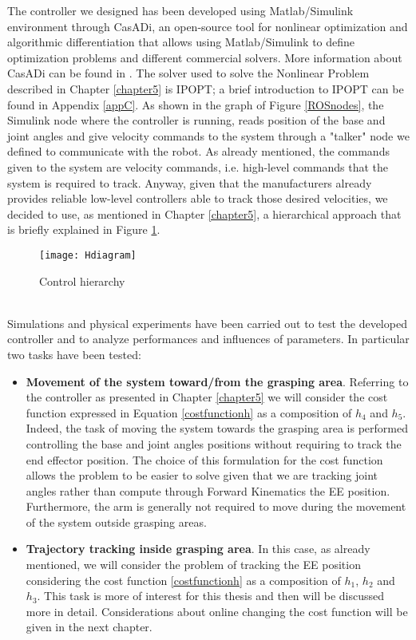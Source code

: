 The controller we designed has been developed using Matlab/Simulink environment through CasADi, an open-source tool for nonlinear optimization and algorithmic differentiation that allows using Matlab/Simulink to define optimization problems and different commercial solvers. More information about CasADi can be found in \cite{Andersson2018}. The solver used to solve the Nonlinear Problem described in Chapter \ref{chapter5} is IPOPT; a brief introduction to IPOPT can be found in Appendix \ref{appC}. As shown in the graph of Figure \ref{ROSnodes}, the Simulink node where the controller is running, reads position of the base and joint angles and give velocity commands to the system through a "talker" node we defined to communicate with the robot. As already mentioned, the commands given to the system are velocity commands, i.e. high-level commands that the system is required to track. Anyway, given that the manufacturers already provides reliable low-level controllers able to track those desired velocities, we decided to use, as mentioned in Chapter \ref{chapter5}, a hierarchical approach that is briefly explained in Figure \ref{Hdiagram}.  
\begin{figure}[h!]

	\texttt{[image: Hdiagram]}
	\centering
	
	\caption{Control hierarchy} 

\label{Hdiagram}
\end{figure}
\\
Simulations and physical experiments have been carried out to test the developed controller and to analyze performances and influences of parameters. In particular two tasks have been tested: 

\begin{itemize}
\item \textbf{Movement of the system toward/from the grasping area}. Referring to the controller as presented in Chapter \ref{chapter5} we will consider the cost function expressed in Equation \ref{costfunctionh} as a composition of $h_4$ and $h_5$. Indeed, the task of moving the system towards the grasping area is performed controlling the base and joint angles positions without requiring to track the end effector position. The choice of this formulation for the cost function allows the problem to be easier to solve given that we are tracking joint angles rather than compute through Forward Kinematics the EE position. Furthermore, the arm is generally not required to move during the movement of the system outside grasping areas.

\item \textbf{Trajectory tracking inside grasping area}. In this case, as already mentioned, we will consider the problem of tracking the EE position considering the cost function \ref{costfunctionh} as a composition of $h_1$, $h_2$ and $h_3$. This task is more of interest for this thesis and then will be discussed more in detail. Considerations about online changing the cost function will be given in the next chapter. 
\end{itemize}

